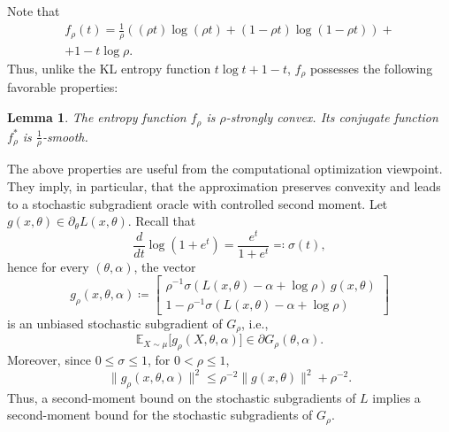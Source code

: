 \documentclass{article}
\newcommand{\E}{\mathbb{E}}
\newcommand*{\eqset}{\coloneqq}
\theoremstyle{plain}
\newtheorem{lemma}[theorem]{Lemma}
\theoremstyle{definition}
\theoremstyle{remark}
\begin{document}
Note that 
\begin{multline*}
    f_\rho(t) = \frac{1}{\rho} \left((\rho t) \log(\rho t) + (1 - \rho t) \log(1 - \rho t)\right) + \\ + 1 - t \log \rho .
\end{multline*}
Thus, unlike the KL entropy function $t \log t + 1 - t$, $f_\rho$
possesses the following favorable properties:
\begin{lemma}\label{Lm:str_convexity}
    The entropy function $f_\rho$ is $\rho$-strongly convex. 
    Its conjugate function $f_\rho^*$ is $\frac{1}{\rho}$-smooth. 
\end{lemma}
The above properties are useful from the computational optimization viewpoint.
They imply, in particular, that the approximation preserves convexity and leads
to a stochastic subgradient oracle with controlled second moment. Let \(g(x,\theta)\in\partial_\theta L(x,\theta)\). 
Recall that
\[
    \frac{d}{dt}\log(1+e^t)
    =
    \frac{e^t}{1+e^t}
    \eqqcolon \sigma(t),
\]
hence for every
\((\theta,\alpha)\), the vector
\begin{equation}\label{eq:stoch_subgrad_G}
    g_\rho(x,\theta,\alpha)
    \eqset
    \begin{bmatrix}
        \rho^{-1}\sigma(L(x,\theta)-\alpha+\log\rho)\,g(x,\theta)\\[1mm]
        1-\rho^{-1}\sigma(L(x,\theta)-\alpha+\log\rho)
    \end{bmatrix}
\end{equation}
is an unbiased stochastic subgradient of \(G_\rho\), i.e.,
\[
    \E_{X\sim\mu}\bigl[g_\rho(X,\theta,\alpha)\bigr]
    \in
    \partial G_\rho(\theta,\alpha).
\]
Moreover, since \(0\le \sigma\le 1\), for \(0<\rho\le 1\),
\begin{equation}\label{eq:2nd_mom_bound}
    \|g_\rho(x,\theta,\alpha)\|^2
    \le
    \rho^{-2}\|g(x,\theta)\|^2+\rho^{-2}.
\end{equation}
Thus, a second-moment bound on the stochastic subgradients of \(L\)
implies a second-moment bound for the stochastic subgradients of
\(G_\rho\). 
\end{document}
